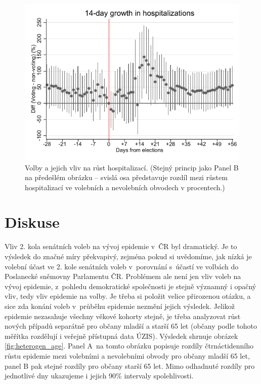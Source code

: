 \begin{figure}[ht]    
    \centering
    \includegraphics[scale=1]{Hospitalization_growth14.pdf}
    \caption{Volby a jejich vliv na růst hospitalizací. (Stejný princip jako Panel B na předešlém obrázku -- svislá osa představuje rozdíl mezi růstem hospitalizací ve volebních a nevolebních obvodech v procentech.)}
     \label{fig:hospit_growth}
\end{figure}

\section*{Diskuse}
Vliv 2. kola senátních voleb na vývoj epidemie v~ČR byl dramatický. Je to výsledek do značné míry překvapivý, zejména pokud si uvědomíme, jak nízká je volební účast ve 2. kole senátních voleb v~porovnání s~účastí ve volbách do Poslanecké sněmovny Parlamentu ČR. Problémem ale není jen vliv voleb na vývoj epidemie, z~pohledu demokratické společnosti je stejně významný i opačný vliv, tedy vliv epidemie na volby. Je třeba si položit velice přirozenou otázku, a sice zda konání voleb v~průběhu epidemie nezmění jejich výsledek. Jelikož epidemie nezasahuje všechny věkové kohorty stejně, je třeba analyzovat růst nových případů separátně pro občany mladší a starší 65 let (občany podle tohoto měřítka rozdělují i veřejně přístupná data ÚZIS). Výsledek shrnuje obrázek  \ref{fig:heterogen_age}. Panel A~na tomto obrázku popisuje rozdíly čtrnáctidenního růstu epidemie mezi volebními a nevolebními obvody pro občany mladší 65 let, panel B pak stejné rozdíly pro občany starší 65 let. Mimo odhadnuté rozdíly pro jednotlivé dny ukazujeme i jejich 90\% intervaly spolehlivosti.

